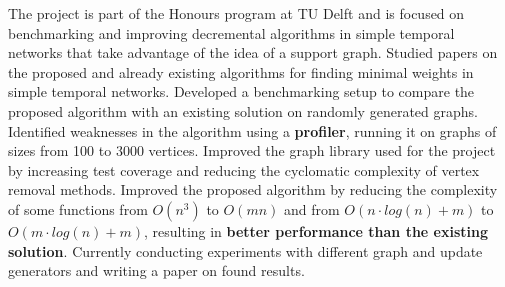    \small{\newline{} The project is part of the Honours program at TU Delft and is focused on benchmarking and improving decremental algorithms in simple temporal networks that take advantage of the idea of a support graph.}
    \vspace{-4pt}
        \resumeItemListStart
            \subItemOfItem
            {Studied papers on the proposed and already existing algorithms for finding minimal weights in simple temporal networks.}
            \subItemOfItem
            {Developed a benchmarking setup to compare the proposed algorithm with an existing solution on randomly generated graphs.}
            \subItemOfItem
            {Identified weaknesses in the algorithm using a \textbf{profiler}, running it on graphs of sizes from 100 to 3000 vertices.}
            \subItemOfItem
            {Improved the graph library used for the project by increasing test coverage and reducing the cyclomatic complexity of vertex removal methods.}
            \subItemOfItem
            {Improved the proposed algorithm by reducing the complexity of some functions from $O(n^3)$ to $O(mn)$ and from $O(n\cdot log(n) + m)$ to $O(m\cdot log(n) + m)$, resulting in \textbf{better performance than the existing solution}.}
            \subItemOfItem
            {Currently conducting experiments with different graph and update generators and writing a paper on found results.}
        \resumeItemListEnd